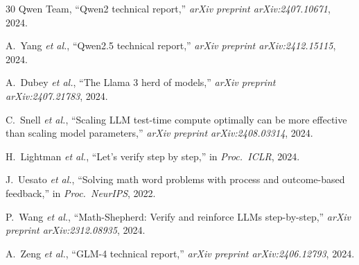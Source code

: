 \begin{thebibliography}{30}
Qwen Team, ``Qwen2 technical report,'' \textit{arXiv preprint arXiv:2407.10671}, 2024.

A.~Yang \textit{et al.}, ``Qwen2.5 technical report,'' \textit{arXiv preprint arXiv:2412.15115}, 2024.

A.~Dubey \textit{et al.}, ``The Llama 3 herd of models,'' \textit{arXiv preprint arXiv:2407.21783}, 2024.

C.~Snell \textit{et al.}, ``Scaling LLM test-time compute optimally can be more effective than scaling model parameters,'' \textit{arXiv preprint arXiv:2408.03314}, 2024.

H.~Lightman \textit{et al.}, ``Let's verify step by step,'' in \textit{Proc.\ ICLR}, 2024.

J.~Uesato \textit{et al.}, ``Solving math word problems with process and outcome-based feedback,'' in \textit{Proc.\ NeurIPS}, 2022.

P.~Wang \textit{et al.}, ``Math-Shepherd: Verify and reinforce LLMs step-by-step,'' \textit{arXiv preprint arXiv:2312.08935}, 2024.

A.~Zeng \textit{et al.}, ``GLM-4 technical report,'' \textit{arXiv preprint arXiv:2406.12793}, 2024.

\end{thebibliography}
